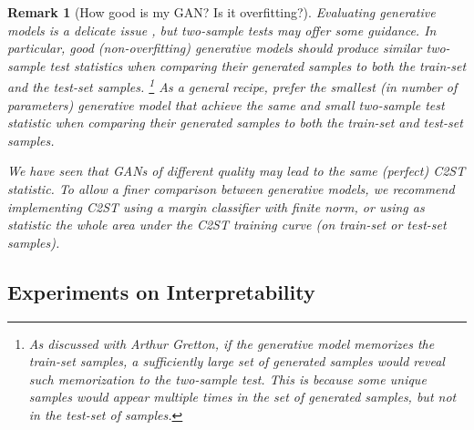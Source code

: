 \documentclass[a4paper]{article}
\newtheorem{remark}{Remark}
\begin{document}
  \begin{remark}[How good is my GAN? Is it overfitting?]
  Evaluating generative models is a delicate issue \citep{theis2015note},
  but two-sample tests may offer some guidance.
  In particular, good (non-overfitting) generative models should produce similar two-sample test
  statistics when comparing their generated samples to both the train-set and the test-set samples.
  \footnote{As discussed with
  Arthur Gretton, if the generative model memorizes the train-set samples, a sufficiently
  large set of generated samples would reveal such memorization to the two-sample test. This
  is because some unique samples would appear multiple times in the set of generated samples,
  but not in the test-set of samples.}
  As a general recipe, prefer \emph{the smallest} (in number of parameters) generative model that achieve the \emph{same and small} two-sample
  test statistic when comparing their generated samples to both the train-set and test-set samples.
  
  We have seen that GANs of different quality may lead to the same
  (perfect) C2ST statistic.  To allow a finer comparison between generative
  models, we recommend implementing C2ST using a margin classifier with
  finite norm, or using as statistic the whole area under the C2ST
  training curve (on train-set or test-set samples).
  \end{remark}

  \subsection{Experiments on Interpretability}
\end{document}

